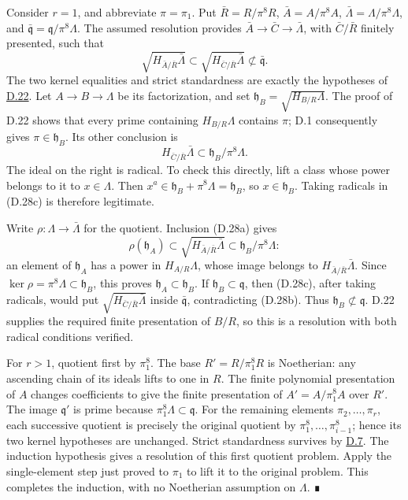 \documentclass[11pt,a4paper,openany]{report}
\begin{document}
Consider \(r=1\), and abbreviate \(\pi=\pi_1\). Put \(\bar R=R/\pi^8R\), \(\bar A=A/\pi^8A\), \(\bar\Lambda=\Lambda/\pi^8\Lambda\), and \(\bar{\mathfrak q}=\mathfrak q/\pi^8\Lambda\). The assumed resolution provides \(\bar A\to\bar C\to\bar\Lambda\), with \(\bar C/\bar R\) finitely presented, such that \[
\sqrt{H_{\bar A/\bar R}\bar\Lambda}
\subset\sqrt{H_{\bar C/\bar R}\bar\Lambda}
\not\subset\bar{\mathfrak q}.
\tag{D.28b}
\] The two kernel equalities and strict standardness are exactly the hypotheses of \hyperref[AG-RG-S05-smoothing-lemma-desingularize-lifting-apply]{D.22}. Let \(A\to B\to\Lambda\) be its factorization, and set \(\mathfrak h_B=\sqrt{H_{B/R}\Lambda}\). The proof of D.22 shows that every prime containing \(H_{B/R}\Lambda\) contains \(\pi\); D.1 consequently gives \(\pi\in\mathfrak h_B\). Its other conclusion is \[
H_{\bar C/\bar R}\bar\Lambda
\subset \mathfrak h_B/\pi^8\Lambda.
\tag{D.28c}
\] The ideal on the right is radical. To check this directly, lift a class whose power belongs to it to \(x\in\Lambda\). Then \(x^a\in\mathfrak h_B+\pi^8\Lambda=\mathfrak h_B\), so \(x\in\mathfrak h_B\). Taking radicals in (D.28c) is therefore legitimate.

Write \(\rho:\Lambda\to\bar\Lambda\) for the quotient. Inclusion (D.28a) gives \[
\rho(\mathfrak h_A)
\subset\sqrt{H_{\bar A/\bar R}\bar\Lambda}
\subset\mathfrak h_B/\pi^8\Lambda:
\] an element of \(\mathfrak h_A\) has a power in \(H_{A/R}\Lambda\), whose image belongs to \(H_{\bar A/\bar R}\bar\Lambda\). Since \(\ker\rho=\pi^8\Lambda\subset\mathfrak h_B\), this proves \(\mathfrak h_A\subset\mathfrak h_B\). If \(\mathfrak h_B\subset\mathfrak q\), then (D.28c), after taking radicals, would put \(\sqrt{H_{\bar C/\bar R}\bar\Lambda}\) inside \(\bar{\mathfrak q}\), contradicting (D.28b). Thus \(\mathfrak h_B\not\subset\mathfrak q\). D.22 supplies the required finite presentation of \(B/R\), so this is a resolution with both radical conditions verified.

For \(r>1\), quotient first by \(\pi_1^8\). The base \(R'=R/\pi_1^8R\) is Noetherian: any ascending chain of its ideals lifts to one in \(R\). The finite polynomial presentation of \(A\) changes coefficients to give the finite presentation of \(A'=A/\pi_1^8A\) over \(R'\). The image \(\mathfrak q'\) is prime because \(\pi_1^8\Lambda\subset\mathfrak q\). For the remaining elements \(\pi_2,\ldots,\pi_r\), each successive quotient is precisely the original quotient by \(\pi_1^8,\ldots,\pi_{i-1}^8\); hence its two kernel hypotheses are unchanged. Strict standardness survives by \hyperref[AG-RG-S05-smoothing-lemma-strictly-standard-base-change]{D.7}. The induction hypothesis gives a resolution of this first quotient problem. Apply the single-element step just proved to \(\pi_1\) to lift it to the original problem. This completes the induction, with no Noetherian assumption on \(\Lambda\). ∎
\end{document}
